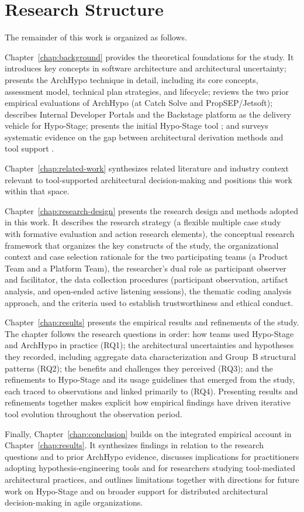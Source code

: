 \section{Research Structure}

The remainder of this work is organized as follows.

Chapter~\ref{chap:background} provides the theoretical foundations for the study.
It introduces key concepts in software architecture and architectural uncertainty;
presents the ArchHypo technique in detail, including its core concepts, assessment
model, technical plan strategies, and lifecycle; reviews the two prior empirical
evaluations of ArchHypo (at Catch Solve and PropSEP/Jetsoft); describes Internal
Developer Portals and the Backstage platform as the delivery vehicle for Hypo-Stage;
presents the initial Hypo-Stage tool \citep{correa2025}; and surveys systematic evidence on the gap between architectural
derivation methods and tool support \citep{souza2019}.

Chapter~\ref{chap:related-work} synthesizes related literature and industry context relevant to tool-supported architectural decision-making and positions this work within that space.

Chapter~\ref{chap:research-design} presents the research design and methods adopted
in this work. It describes the research strategy (a flexible multiple case study
with formative evaluation and action research elements), the conceptual research
framework that organizes the key constructs of the study, the organizational context and
case selection rationale for the two participating teams (a Product Team and a Platform
Team), the researcher's dual role as participant observer and facilitator, the data
collection procedures (participant observation, artifact analysis, and open-ended active
listening sessions), the thematic coding analysis approach, and the criteria used to
establish trustworthiness and ethical conduct.

Chapter~\ref{chap:results} presents the empirical results and refinements of the study.
The chapter follows the research questions in order: how teams used Hypo-Stage and
ArchHypo in practice (RQ1); the architectural uncertainties and hypotheses they
recorded, including aggregate data characterization and Group~B structural patterns
(RQ2); the benefits and challenges they perceived (RQ3); and the refinements to
Hypo-Stage and its usage guidelines that emerged from the study, each traced to
observations and linked primarily to (RQ4). Presenting results and refinements together
makes explicit how empirical findings have driven iterative tool evolution throughout the
observation period.

Finally, Chapter~\ref{chap:conclusion} builds on the integrated empirical account in Chapter~\ref{chap:results}. 
It synthesizes findings in relation to the research questions and to prior ArchHypo evidence, discusses implications for practitioners adopting
hypothesis-engineering tools and for researchers studying tool-mediated architectural
practices, and outlines limitations together with directions for future work on Hypo-Stage and on broader
support for distributed architectural decision-making in agile organizations.
